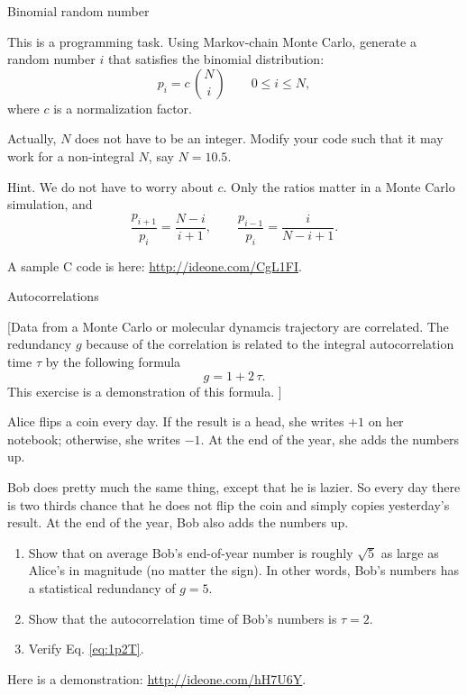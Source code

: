 \documentclass[12pt]{article}
\begin{document}
\begin{problem}{Binomial random number}



This is a programming task.
%
Using Markov-chain Monte Carlo,
generate a random number $i$ that satisfies the binomial distribution:
$$
p_i = c \, {N \choose i}
\qquad
0 \le i \le N
,
$$
where $c$ is a normalization factor.

Actually, $N$ does not have to be an integer.
Modify your code such that it may work for a non-integral $N$,
say $N = 10.5$.

Hint. We do not have to worry about $c$.
Only the ratios matter in a Monte Carlo simulation, and
$$
\frac{ p_{i+1} } { p_i } = \frac{ N - i } { i + 1 },
\qquad
\frac{ p_{i-1} } { p_i } = \frac{ i } { N - i + 1}.
$$

A sample C code is here: \url{http://ideone.com/CgL1FI}.

\end{problem}



\begin{problem}{Autocorrelations}

[Data from a Monte Carlo or molecular dynamcis trajectory are correlated.
  The redundancy $g$ because of the correlation
  is related to the integral autocorrelation time $\tau$
  by the following formula
  \begin{equation}
    g = 1 + 2 \, \tau.
  \label{eq:1p2T}
  \end{equation}
  This exercise is a demonstration of this formula.
]

Alice flips a coin every day.
%
If the result is a head, she writes $+1$ on her notebook;
otherwise, she writes $-1$.
%
At the end of the year, she adds the numbers up.

Bob does pretty much the same thing, except that he is lazier.
%
So every day there is two thirds chance that he does not flip the coin
and simply copies yesterday's result.
%
At the end of the year, Bob also adds the numbers up.

\begin{enumerate}
  \item
  Show that on average Bob's end-of-year number
  is roughly $\sqrt 5$ as large as Alice's
  in magnitude (no matter the sign).
  In other words, Bob's numbers has
  a statistical redundancy of $g = 5$.

  \item
  Show that the autocorrelation time of Bob's numbers
  is $\tau = 2$.

  \item
  Verify Eq. \eqref{eq:1p2T}.
\end{enumerate}

Here is a demonstration:
\url{http://ideone.com/hH7U6Y}.

\end{problem}
\end{document}
